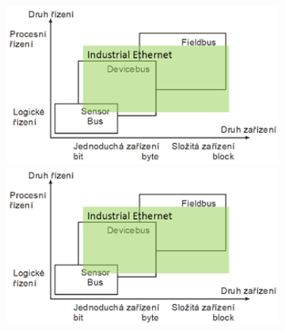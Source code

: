 \begin{figure}[h]
\begin{figure}[h]
  \begin{center}
    \includegraphics[scale = 1]{img/Picture17.png}
  \end{center}
    \begin{center}
        \includegraphics[scale = 1]{img/Picture17.png}
    \end{center}
\end{figure}


\end{figure}
